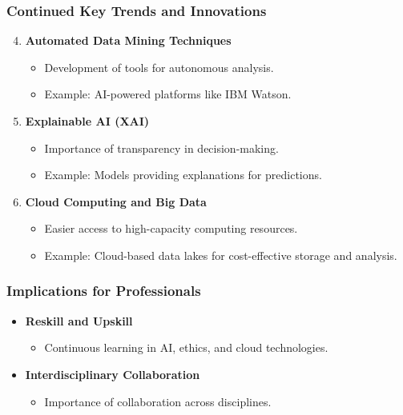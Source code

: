 \documentclass{beamer}
\begin{document}
\begin{frame}[fragile]
    \frametitle{Continued Key Trends and Innovations}
    \begin{enumerate}
        \setcounter{enumi}{3} %
        \item \textbf{Automated Data Mining Techniques}
            \begin{itemize}
                \item Development of tools for autonomous analysis.
                \item Example: AI-powered platforms like IBM Watson.
            \end{itemize}

        \item \textbf{Explainable AI (XAI)}
            \begin{itemize}
                \item Importance of transparency in decision-making.
                \item Example: Models providing explanations for predictions.
            \end{itemize}

        \item \textbf{Cloud Computing and Big Data}
            \begin{itemize}
                \item Easier access to high-capacity computing resources.
                \item Example: Cloud-based data lakes for cost-effective storage and analysis.
            \end{itemize}
    \end{enumerate}
\end{frame}

\begin{frame}[fragile]
    \frametitle{Implications for Professionals}
    \begin{itemize}
        \item \textbf{Reskill and Upskill}
            \begin{itemize}
                \item Continuous learning in AI, ethics, and cloud technologies.
            \end{itemize}
        \item \textbf{Interdisciplinary Collaboration}
            \begin{itemize}
                \item Importance of collaboration across disciplines.
            \end{itemize}
    \end{itemize}
\end{frame}
\end{document}
